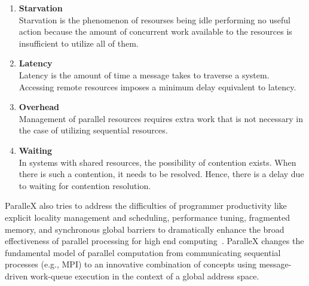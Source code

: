\begin{enumerate}
\item \textbf{Starvation}\\
  Starvation is the phenomenon of resourses being idle performing no useful action because the amount of concurrent work available to the resources is insufficient to utilize all of them.
\item \textbf{Latency}\\
  Latency is the amount of time a message takes to traverse a system. Accessing remote resources imposes a minimum delay equivalent to latency.
\item \textbf{Overhead}\\
  Management of parallel resources requires extra work that is not necessary in the case of utilizing sequential resources.
\item \textbf{Waiting}\\
  In systems with shared resources, the possibility of contention exists. When there is such a contention, it needs to be resolved. Hence, there is a delay due to waiting for contention resolution.
\end{enumerate}

ParalleX also tries to address the difficulties of programmer productivity like explicit locality management and scheduling, performance tuning, fragmented memory, and synchronous global barriers to dramatically enhance the broad effectiveness of parallel processing for high end computing~\cite{4228212}. ParalleX changes the fundamental model of parallel computation from communicating sequential processes (e.g., MPI) to an innovative combination of concepts using message-driven work-queue execution in the context of a global address space.~\cite{tabbal2011preliminary,sterling2014towards}

